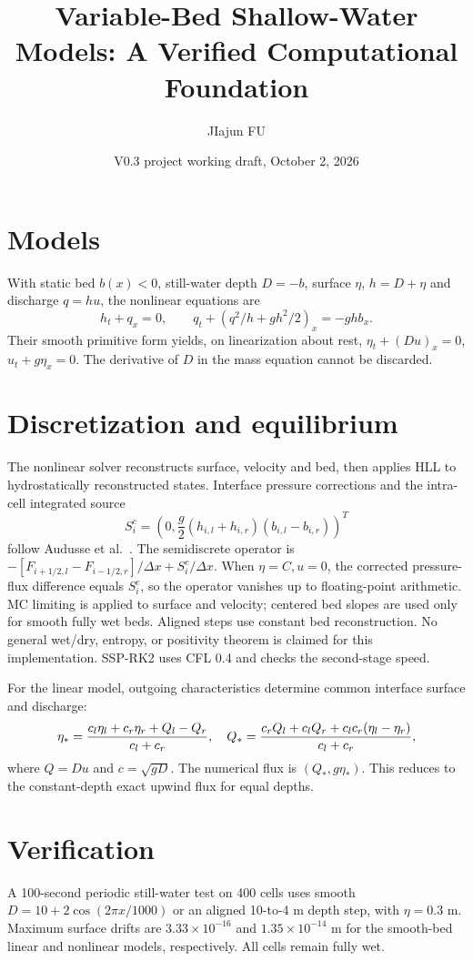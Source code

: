 \documentclass[11pt]{article}
\title{Variable-Bed Shallow-Water Models: A Verified Computational Foundation}
\author{JIajun FU}
\date{V0.3 project working draft, October 2, 2026}
\begin{document}
\maketitle
\section{Models}
With static bed $b(x)<0$, still-water depth $D=-b$, surface $\eta$,
$h=D+\eta$ and discharge $q=hu$, the nonlinear equations are
\[
h_t+q_x=0,\qquad q_t+(q^2/h+gh^2/2)_x=-ghb_x.
\]
Their smooth primitive form yields, on linearization about rest,
$\eta_t+(Du)_x=0$, $u_t+g\eta_x=0$.
The derivative of $D$ in the mass equation cannot be discarded.

\section{Discretization and equilibrium}
The nonlinear solver reconstructs surface, velocity and bed, then applies
HLL to hydrostatically reconstructed states. Interface pressure corrections
and the intra-cell integrated source
\[
S_i^c=\left(0,\frac g2(h_{i,l}+h_{i,r})(b_{i,l}-b_{i,r})\right)^T
\]
follow Audusse et al.\ \cite{audusse2004}. The semidiscrete operator is
$-[F_{i+1/2,l}-F_{i-1/2,r}]/\Delta x+S_i^c/\Delta x$.
When $\eta=C,u=0$, the corrected pressure-flux difference equals $S_i^c$,
so the operator vanishes up to floating-point arithmetic.
MC limiting is applied to surface and velocity; centered bed slopes are used
only for smooth fully wet beds. Aligned steps use constant bed reconstruction.
No general wet/dry, entropy, or positivity theorem is claimed for this implementation.
SSP-RK2 uses CFL 0.4 and checks the second-stage speed.

For the linear model, outgoing characteristics determine common interface
surface and discharge:
\[
\eta_*={c_l\eta_l+c_r\eta_r+Q_l-Q_r\over c_l+c_r},\quad
Q_*={c_rQ_l+c_lQ_r+c_lc_r(\eta_l-\eta_r)\over c_l+c_r},
\]
where $Q=Du$ and $c=\sqrt{gD}$. The numerical flux is $(Q_*,g\eta_*)$.
This reduces to the constant-depth exact upwind flux for equal depths.

\section{Verification}
A 100-second periodic still-water test on 400 cells uses smooth
$D=10+2\cos(2\pi x/1000)$ or an aligned 10-to-4 m depth step, with
$\eta=0.3$ m. Maximum surface drifts are
$3.33\times10^{-16}$ and $1.35\times10^{-14}$ m for the smooth-bed
linear and nonlinear models, respectively. All cells remain fully wet.
\end{document}
